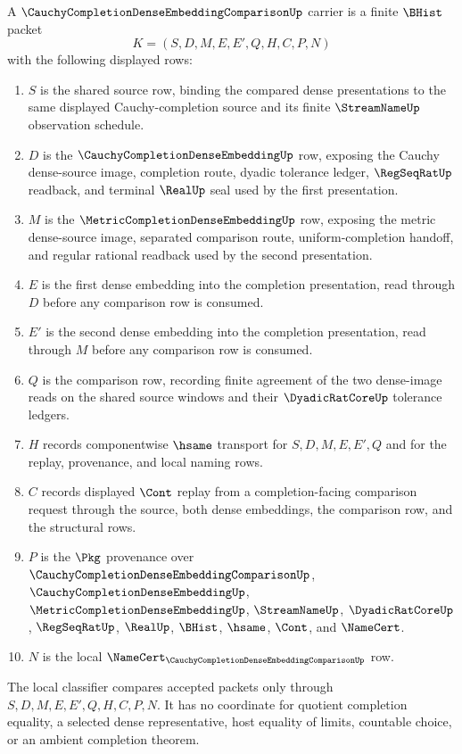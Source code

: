 \begin{definition}
\label{def:cauchy-completion-dense-embedding-comparison-carrier}
A $\CauchyCompletionDenseEmbeddingComparisonUp$ carrier is a finite $\BHist$ packet
$$
K=(S,D,M,E,E',Q,H,C,P,N)
$$
with the following displayed rows:
\begin{enumerate}
\item $S$ is the shared source row, binding the compared dense presentations to the same displayed Cauchy-completion source and its finite $\StreamNameUp$ observation schedule.
\item $D$ is the $\CauchyCompletionDenseEmbeddingUp$ row, exposing the Cauchy dense-source image, completion route, dyadic tolerance ledger, $\RegSeqRatUp$ readback, and terminal $\RealUp$ seal used by the first presentation.
\item $M$ is the $\MetricCompletionDenseEmbeddingUp$ row, exposing the metric dense-source image, separated comparison route, uniform-completion handoff, and regular rational readback used by the second presentation.
\item $E$ is the first dense embedding into the completion presentation, read through $D$ before any comparison row is consumed.
\item $E'$ is the second dense embedding into the completion presentation, read through $M$ before any comparison row is consumed.
\item $Q$ is the comparison row, recording finite agreement of the two dense-image reads on the shared source windows and their $\DyadicRatCoreUp$ tolerance ledgers.
\item $H$ records componentwise $\hsame$ transport for $S,D,M,E,E',Q$ and for the replay, provenance, and local naming rows.
\item $C$ records displayed $\Cont$ replay from a completion-facing comparison request through the source, both dense embeddings, the comparison row, and the structural rows.
\item $P$ is the $\Pkg$ provenance over $\CauchyCompletionDenseEmbeddingComparisonUp$, $\CauchyCompletionDenseEmbeddingUp$, $\MetricCompletionDenseEmbeddingUp$, $\StreamNameUp$, $\DyadicRatCoreUp$, $\RegSeqRatUp$, $\RealUp$, $\BHist$, $\hsame$, $\Cont$, and $\NameCert$.
\item $N$ is the local $\NameCert_{\CauchyCompletionDenseEmbeddingComparisonUp}$ row.
\end{enumerate}
The local classifier compares accepted packets only through $S,D,M,E,E',Q,H,C,P,N$. It has no coordinate for quotient completion equality, a selected dense representative, host equality of limits, countable choice, or an ambient completion theorem.
\end{definition}

